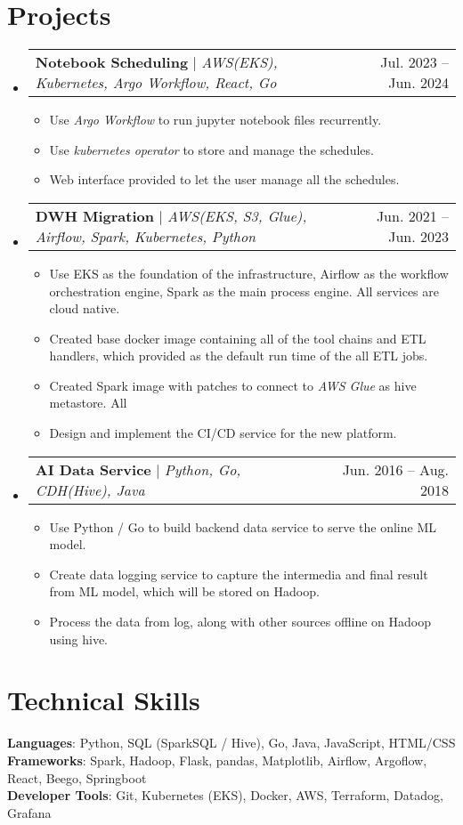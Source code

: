 \documentclass[a4paper,11pt]{article}
\makeatletter
\newcommand{\resumeItem}[1]{
  \item\small{
    {#1 \vspace{-2pt}}
  }
}
\newcommand{\resumeProjectHeading}[2]{
    \item
    \begin{tabular*}{0.97\textwidth}{l@{\extracolsep{\fill}}r}
      \small#1 & #2 \\
    \end{tabular*}\vspace{-7pt}
}
\newcommand{\resumeSubHeadingListStart}{\begin{itemize}[leftmargin=0.15in, label={}]}
\newcommand{\resumeSubHeadingListEnd}{\end{itemize}}
\newcommand{\resumeItemListStart}{\begin{itemize}}
\newcommand{\resumeItemListEnd}{\end{itemize}\vspace{-5pt}}
\makeatother
\begin{document}
\section{Projects}
    \resumeSubHeadingListStart
      \resumeProjectHeading
          {\textbf{Notebook Scheduling} $|$ \emph{AWS(EKS), Kubernetes, Argo Workflow, React, Go}}{Jul. 2023 -- Jun. 2024}
          \resumeItemListStart
            \resumeItem{Use \emph{Argo Workflow} to run jupyter notebook files recurrently.}
            \resumeItem{Use \emph{kubernetes operator} to store and manage the schedules.}
            \resumeItem{Web interface provided to let the user manage all the schedules.}
          \resumeItemListEnd
      \resumeProjectHeading
          {\textbf{DWH Migration} $|$ \emph{AWS(EKS, S3, Glue), Airflow, Spark, Kubernetes, Python}}{Jun. 2021 -- Jun. 2023}
          \resumeItemListStart
            \resumeItem{Use EKS as the foundation of the infrastructure, Airflow as the workflow orchestration engine, Spark as the main process engine. All services are cloud native.}
            \resumeItem{Created base docker image containing all of the tool chains and ETL handlers, which provided as the default run time of the all ETL jobs.}
            \resumeItem{Created Spark image with patches to connect to \emph{AWS Glue} as hive metastore. All }
            \resumeItem{Design and implement the CI/CD service for the new platform.}
          \resumeItemListEnd
      \resumeProjectHeading
          {\textbf{AI Data Service} $|$ \emph{Python, Go, CDH(Hive), Java}}{Jun. 2016 -- Aug. 2018}
          \resumeItemListStart
            \resumeItem{Use Python / Go to build backend data service to serve the online ML model.}
            \resumeItem{Create data logging service to capture the intermedia and final result from ML model, which will be stored on Hadoop.}
            \resumeItem{Process the data from log, along with other sources offline on Hadoop using hive.}
          \resumeItemListEnd
    \resumeSubHeadingListEnd


%
\section{Technical Skills}
 \begin{itemize}[leftmargin=0.15in, label={}]
    \small{\item{
     \textbf{Languages}{: Python, SQL (SparkSQL / Hive), Go, Java, JavaScript, HTML/CSS} \\
     \textbf{Frameworks}{: Spark, Hadoop, Flask, pandas, Matplotlib, Airflow, Argoflow, React, Beego, Springboot } \\
     \textbf{Developer Tools}{: Git, Kubernetes (EKS), Docker, AWS, Terraform, Datadog, Grafana} \\
    }}
 \end{itemize}


\end{document}
